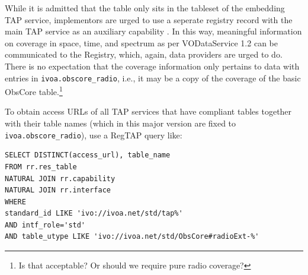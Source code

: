 \documentclass[11pt,a4paper]{ivoa}
\begin{document}
While it is admitted that the table only sits in the tableset of the
embedding TAP service, implementors are urged to use a seperate registry
record with the main TAP service as an auxiliary capability
\citep{2019ivoa.spec.0520D}. In this way, meaningful information
on coverage in space, time, and spectrum as per VODataService 1.2 can
be communicated to the Registry, which, again, data providers are urged
to do. There is no expectation that the coverage information only
pertains to data with entries in \verb|ivoa.obscore_radio|, i.e., it may be
a copy of the coverage of the basic ObsCore table.\footnote{Is that
acceptable? Or should we require pure radio coverage?}



To obtain access URLs of all TAP services that have compliant tables
together with their table names (which in this major version are fixed
to \verb|ivoa.obscore_radio|), use a RegTAP \citep{2019ivoa.spec.1011D}
query like:

\begin{lstlisting}
SELECT DISTINCT(access_url), table_name
FROM rr.res_table
NATURAL JOIN rr.capability
NATURAL JOIN rr.interface
WHERE
standard_id LIKE 'ivo://ivoa.net/std/tap%'
AND intf_role='std'
AND table_utype LIKE 'ivo://ivoa.net/std/ObsCore#radioExt-%'
\end{lstlisting}



\appendix





\end{document}
